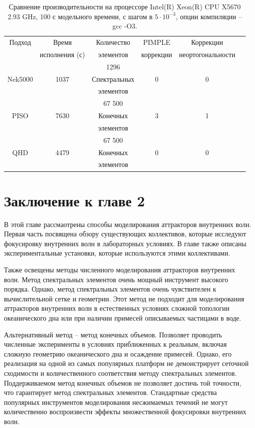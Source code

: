 \begin{table}[]
    \caption{\label{tab:perfom}Сравнение производительности на процессоре Intel(R) Xeon(R) CPU X5670 2.93 GHz, 100 с модельного времени, с шагом в $5 \cdot 10^{-3}$, опции компиляции -- gcc -O3.}
    
    \begin{tabular}{c|c|c|c|c|c}
        Подход & Время  & Количество  & PIMPLE      & Коррекции  \\
                 & исполнения (с)   &   элементов  & коррекции & неортогональности     \\
        \hline
         &  & 1296 &  &  \\
        Nek5000 & 1037 & Спектральных & 0 & 0 \\
         &  & элементов &  &  \\
        \hline
         &  & 67 500 &  & \\
        PISO & 7630 & Конечных & 3 & 1\\
         &  & элементов &  & \\
        \hline
         &  & 67 500 &  & \\
        QHD & 4479 &  Конечных & 0 & 0\\
         &  & элементов &  & \\
        \hline
    \end{tabular}
    
    \end{table}

\section*{Заключение к главе 2}

В этой главе рассмаотрены способы моделирования аттракторов внутренних волн. Первая часть посвящена обзору существующих коллективов, которые исследуют фокусировку внутренних волн в лабораторных условиях. В главе также описаны экспериментальные установки, которые используются этими коллективами. 

Также освещены методы численного моделирования аттракторов внутренних волн. Метод спектральных элементов очень мощный инструмент высокого порядка. Однако, метод спектральных элементов очень чувствителен к вычислительной сетке и геометрии. Этот метод не подходит для моделирования аттракторов внутренних волн в естественных условиях сложной топологии океанического дна или при наличии примесей описываемых частицами в воде.

Альтернативный метод -- метод конечных объемов. Позволяет проводить численные эксперименты в условиях приближенных к реальным, включая сложную геометрию океанического дна и осаждение примесей. Однако, его реализация на одной из самых популярных платформ не демонстрирует сеточной сходимости и количественного соответствия методу спектральных элементов. Поддерживаемом метод конечных объемов не позволяет достичь той точности, что гарантирует метод спектральных элементов. Стандартные средства популярных инструментов моделирования несжимаемых течений не могут количественно воспроизвести эффекты множественной фокусировки внутренних волн. 

